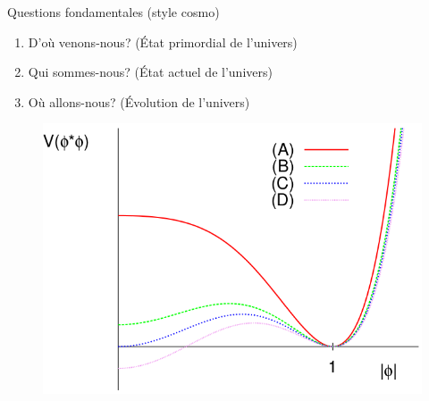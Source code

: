 \documentclass[handout]{beamer}
\begin{document}
\begin{frame}
\begin{block}{Questions fondamentales (style cosmo)}
\begin{enumerate}
\item D'où venons-nous? (État primordial de l'univers)
\item Qui sommes-nous? (État actuel de l'univers)
\item Où allons-nous? (Évolution de l'univers)
\end{enumerate}
\end{block}
\begin{figure}[0.5\textwidth]
   \includegraphics[scale=0.25]{evo_pot.png}
 \end{figure}
\end{frame}


\end{document}
